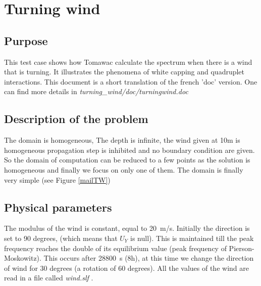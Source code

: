 \chapter{Turning wind}
%

%
\section{Purpose}
%
This test case shows how Tomawac calculate the spectrum when there is a wind that is turning. It illustrates the phenomena of white capping and quadruplet interactions.  This document is a short translation of the french 'doc' version. One can find more details in {\it turning\_wind/doc/turningwind.doc}

%
\section{Description of the problem}
%
The domain is homogeneous, The depth is infinite, the wind given at 10m is homogeneous  propagation step is inhibited and no boundary condition are given.
So the domain of computation can be reduced to a few points as the solution is homogeneous and finally we focus on only one of them. The domain is finally very simple (see Figure \ref{mailTW})


%
%
\section{Physical parameters}
%
The modulus of the wind is constant, equal to 20~m/s. Initially the direction is set to 90 degrees, (which means that $U_Y$ is null). This is maintained till the peak frequency reaches the double of its equilibrium value (peak frequency of Pierson-Moskowitz). This occurs after 28800~s (8h), at this time we change the direction of wind for 30 degrees (a rotation of 60 degrees). All the values of the wind are read in a file called {\it wind.slf  }.
%
%

